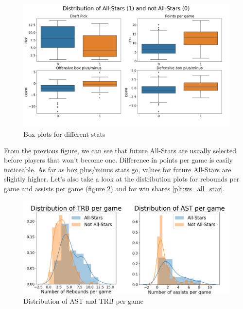 \documentclass[a4paper]{article}
\begin{document}
\begin{figure}[h!]
\begin{center}
\includegraphics[scale=0.3]{box_plots_all_star.png}
\end{center}
\caption{Box plots for different stats}
\label{plt:box_plots_all_star}
\end{figure}

From the previous figure, we can see that future All-Stars are usually selected before players that won't become one. Difference in points per game is easily noticeable. As far as box plus/minus stats go, values for future All-Stars are slightly higher. Let's also take a look at the distribution plots for rebounds per game and assists per game (figure \ref{plt:trb_ast_all_star}) and for win shares \ref{plt:ws_all_star}.

\begin{figure}[h!]
\begin{center}
\includegraphics[scale=0.38]{trb_ast_all_star.png}
\end{center}
\caption{Distribution of AST and TRB per game}
\label{plt:trb_ast_all_star}
\end{figure}
\end{document}
